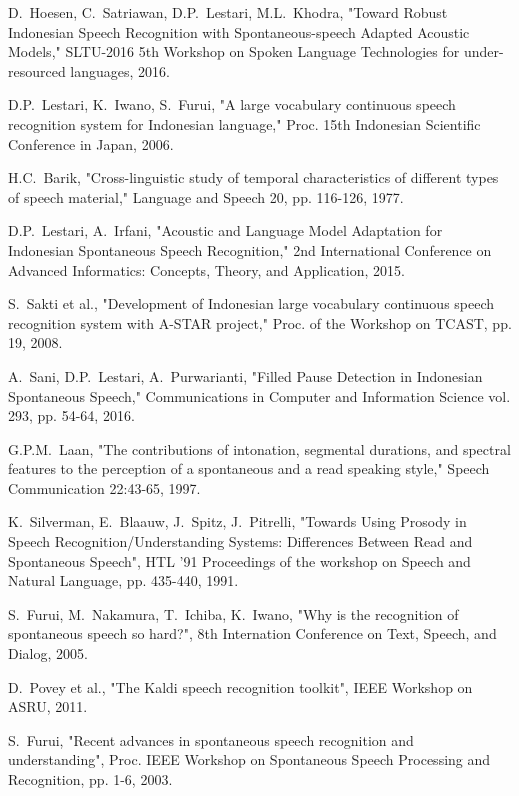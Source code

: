 \documentclass[conference]{IEEEtran}
\begin{document}
\begin{thebibliography}{1}

D.~Hoesen, C.~Satriawan, D.P.~Lestari, M.L.~Khodra,
    "Toward Robust Indonesian Speech Recognition with Spontaneous-speech Adapted Acoustic Models,"
    SLTU-2016 5th Workshop on Spoken Language Technologies for under-resourced languages, 2016.

D.P.~Lestari, K.~Iwano, S.~Furui,
    "A large vocabulary continuous speech recognition system for Indonesian language,"
    Proc. 15th Indonesian Scientific Conference in Japan, 2006.

H.C.~Barik, 
    "Cross-linguistic study of temporal characteristics of different types of speech material,"
    Language and Speech 20, pp. 116-126, 1977.

D.P.~Lestari, A.~Irfani,
    "Acoustic and Language Model Adaptation for Indonesian Spontaneous Speech Recognition,"
    2nd International Conference on Advanced Informatics: Concepts, Theory, and Application, 2015.

S.~Sakti et al.,
    "Development of Indonesian large vocabulary continuous speech recognition system with A-STAR project,"
    Proc. of the Workshop on TCAST, pp. 19, 2008.

A.~Sani, D.P.~Lestari, A.~Purwarianti,
    "Filled Pause Detection in Indonesian Spontaneous Speech,"
    Communications in Computer and Information Science vol. 293, pp. 54-64, 2016.

G.P.M.~Laan,
    "The contributions of intonation, segmental durations, and spectral features to the perception of a spontaneous and a read speaking style,"
    Speech Communication 22:43-65, 1997.

K.~Silverman, E.~Blaauw, J.~Spitz, J.~Pitrelli,
    "Towards Using Prosody in Speech Recognition/Understanding Systems: Differences Between Read and Spontaneous Speech",
    HTL '91 Proceedings of the workshop on Speech and Natural Language, pp. 435-440, 1991.

S.~Furui, M.~Nakamura, T.~Ichiba, K.~Iwano,
	"Why is the recognition of spontaneous speech so hard?",
	8th Internation Conference on Text, Speech, and Dialog, 2005.

D.~Povey et al.,
    "The Kaldi speech recognition toolkit",
    IEEE Workshop on ASRU, 2011.

S.~Furui,
    "Recent advances in spontaneous speech recognition and understanding",
    Proc. IEEE Workshop on Spontaneous Speech Processing and Recognition, pp. 1-6, 2003.


\end{thebibliography}
\end{document}
